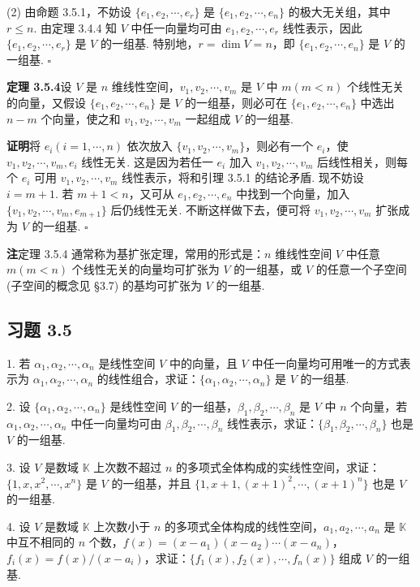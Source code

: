 \documentclass[UTF8, 12pt, fontset=fandol, oneside]{ctexart}
\begin{document}
(2) 由命题 3.5.1，不妨设 $\{e_1,e_2,\cdots,e_r\}$ 是 $\{e_1,e_2,\cdots,e_n\}$ 的极大无关组，其中 $r\leq n$. 由定理 3.4.4 知 $V$ 中任一向量均可由 $e_1,e_2,\cdots,e_r$ 线性表示，因此 $\{e_1,e_2,\cdots,e_r\}$ 是 $V$ 的一组基. 特别地，$r=\dim V=n$，即 $\{e_1,e_2,\cdots,e_n\}$ 是 $V$ 的一组基. $\square$

\noindent\textbf{定理 3.5.4}\quad 设 $V$ 是 $n$ 维线性空间，$v_1,v_2,\cdots,v_m$ 是 $V$ 中 $m(m<n)$ 个线性无关的向量，又假设 $\{e_1,e_2,\cdots,e_n\}$ 是 $V$ 的一组基，则必可在 $\{e_1,e_2,\cdots,e_n\}$ 中选出 $n-m$ 个向量，使之和 $v_1,v_2,\cdots,v_m$ 一起组成 $V$ 的一组基.

\noindent\textbf{证明}\quad 将 $e_i(i=1,\cdots,n)$ 依次放入 $\{v_1,v_2,\cdots,v_m\}$，则必有一个 $e_i$，使 $v_1,v_2,\cdots,v_m,e_i$ 线性无关. 这是因为若任一 $e_i$ 加入 $v_1,v_2,\cdots,v_m$ 后线性相关，则每个 $e_i$ 可用 $v_1,v_2,\cdots,v_m$ 线性表示，将和引理 3.5.1 的结论矛盾. 现不妨设 $i=m+1$. 若 $m+1<n$，又可从 $e_1,e_2,\cdots,e_n$ 中找到一个向量，加入 $\{v_1,v_2,\cdots,v_m,e_{m+1}\}$ 后仍线性无关. 不断这样做下去，便可将 $v_1,v_2,\cdots,v_m$ 扩张成为 $V$ 的一组基. $\square$

\noindent\textbf{注}\quad 定理 3.5.4 通常称为基扩张定理，常用的形式是：$n$ 维线性空间 $V$ 中任意 $m(m<n)$ 个线性无关的向量均可扩张为 $V$ 的一组基，或 $V$ 的任意一个子空间 (子空间的概念见 §3.7) 的基均可扩张为 $V$ 的一组基.

\subsection*{习题 3.5}

1. 若 $\alpha_1,\alpha_2,\cdots,\alpha_n$ 是线性空间 $V$ 中的向量，且 $V$ 中任一向量均可用唯一的方式表示为 $\alpha_1,\alpha_2,\cdots,\alpha_n$ 的线性组合，求证：$\{\alpha_1,\alpha_2,\cdots,\alpha_n\}$ 是 $V$ 的一组基.

2. 设 $\{\alpha_1,\alpha_2,\cdots,\alpha_n\}$ 是线性空间 $V$ 的一组基，$\beta_1,\beta_2,\cdots,\beta_n$ 是 $V$ 中 $n$ 个向量，若 $\alpha_1,\alpha_2,\cdots,\alpha_n$ 中任一向量均可由 $\beta_1,\beta_2,\cdots,\beta_n$ 线性表示，求证：$\{\beta_1,\beta_2,\cdots,\beta_n\}$ 也是 $V$ 的一组基.

3. 设 $V$ 是数域 $\mathbb{K}$ 上次数不超过 $n$ 的多项式全体构成的实线性空间，求证：$\{1,x,x^2,\cdots,x^n\}$ 是 $V$ 的一组基，并且 $\{1,x+1,(x+1)^2,\cdots,(x+1)^n\}$ 也是 $V$ 的一组基.

4. 设 $V$ 是数域 $\mathbb{K}$ 上次数小于 $n$ 的多项式全体构成的线性空间，$a_1,a_2,\cdots,a_n$ 是 $\mathbb{K}$ 中互不相同的 $n$ 个数，$f(x)=(x-a_1)(x-a_2)\cdots(x-a_n)$，$f_i(x)=f(x)/(x-a_i)$，求证：$\{f_1(x),f_2(x),\cdots,f_n(x)\}$ 组成 $V$ 的一组基.
\end{document}
